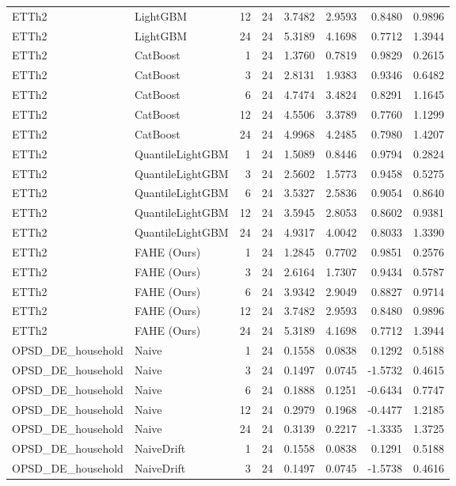 \begin{tabular}{llrrrrrr}
ETTh2 & LightGBM & 12 & 24 & 3.7482 & 2.9593 & 0.8480 & 0.9896 \\
ETTh2 & LightGBM & 24 & 24 & 5.3189 & 4.1698 & 0.7712 & 1.3944 \\
ETTh2 & CatBoost & 1 & 24 & 1.3760 & 0.7819 & 0.9829 & 0.2615 \\
ETTh2 & CatBoost & 3 & 24 & 2.8131 & 1.9383 & 0.9346 & 0.6482 \\
ETTh2 & CatBoost & 6 & 24 & 4.7474 & 3.4824 & 0.8291 & 1.1645 \\
ETTh2 & CatBoost & 12 & 24 & 4.5506 & 3.3789 & 0.7760 & 1.1299 \\
ETTh2 & CatBoost & 24 & 24 & 4.9968 & 4.2485 & 0.7980 & 1.4207 \\
ETTh2 & QuantileLightGBM & 1 & 24 & 1.5089 & 0.8446 & 0.9794 & 0.2824 \\
ETTh2 & QuantileLightGBM & 3 & 24 & 2.5602 & 1.5773 & 0.9458 & 0.5275 \\
ETTh2 & QuantileLightGBM & 6 & 24 & 3.5327 & 2.5836 & 0.9054 & 0.8640 \\
ETTh2 & QuantileLightGBM & 12 & 24 & 3.5945 & 2.8053 & 0.8602 & 0.9381 \\
ETTh2 & QuantileLightGBM & 24 & 24 & 4.9317 & 4.0042 & 0.8033 & 1.3390 \\
ETTh2 & FAHE (Ours) & 1 & 24 & 1.2845 & 0.7702 & 0.9851 & 0.2576 \\
ETTh2 & FAHE (Ours) & 3 & 24 & 2.6164 & 1.7307 & 0.9434 & 0.5787 \\
ETTh2 & FAHE (Ours) & 6 & 24 & 3.9342 & 2.9049 & 0.8827 & 0.9714 \\
ETTh2 & FAHE (Ours) & 12 & 24 & 3.7482 & 2.9593 & 0.8480 & 0.9896 \\
ETTh2 & FAHE (Ours) & 24 & 24 & 5.3189 & 4.1698 & 0.7712 & 1.3944 \\
OPSD_DE_household & Naive & 1 & 24 & 0.1558 & 0.0838 & 0.1292 & 0.5188 \\
OPSD_DE_household & Naive & 3 & 24 & 0.1497 & 0.0745 & -1.5732 & 0.4615 \\
OPSD_DE_household & Naive & 6 & 24 & 0.1888 & 0.1251 & -0.6434 & 0.7747 \\
OPSD_DE_household & Naive & 12 & 24 & 0.2979 & 0.1968 & -0.4477 & 1.2185 \\
OPSD_DE_household & Naive & 24 & 24 & 0.3139 & 0.2217 & -1.3335 & 1.3725 \\
OPSD_DE_household & NaiveDrift & 1 & 24 & 0.1558 & 0.0838 & 0.1291 & 0.5188 \\
OPSD_DE_household & NaiveDrift & 3 & 24 & 0.1497 & 0.0745 & -1.5738 & 0.4616 \\

\end{tabular}
